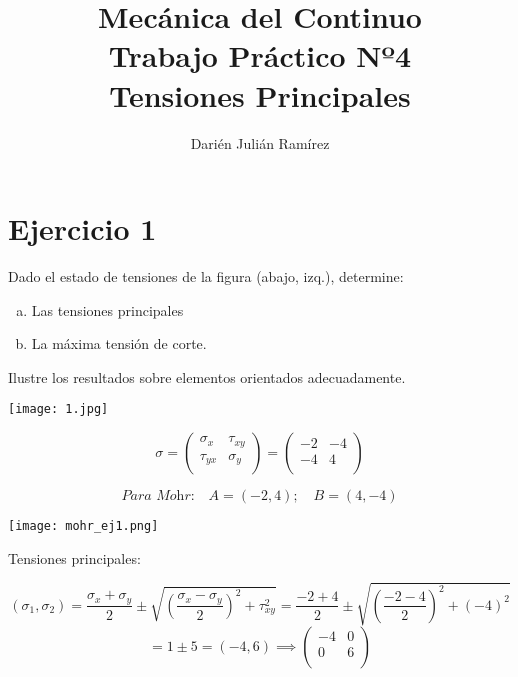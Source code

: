\documentclass[a4paper,12pt,twoside,final,spanish]{article}
\title{\Huge Mecánica del Continuo\\
Trabajo Práctico Nº4\\
Tensiones Principales}
\author{Darién Julián Ramírez}
\date{\vspace{-5ex}}
\begin{document}
\maketitle %

\section*{Ejercicio 1}

Dado el estado de tensiones de la figura (abajo, izq.), determine: 
\begin{enumerate}[a.]
\item Las tensiones principales 
\item La máxima tensión de corte.  
\end{enumerate}

Ilustre los resultados sobre elementos orientados adecuadamente.

\begin{center}
\texttt{[image: 1.jpg]}
\end{center}

\dotfill

\[
\sigma=
\left(\begin{matrix}
\sigma_{x} & \tau_{xy} \\
\tau_{yx} & \sigma_{y} \\
\end{matrix}\right)=
\left(\begin{matrix}
-2 & -4 \\
-4 & 4 \\
\end{matrix}\right)
\]

\[
\textit{Para Mohr:}\quad A=(-2,4);\quad B=(4,-4)
\]

\begin{center}
\texttt{[image: mohr\_ej1.png]}
\end{center}

Tensiones principales:

\[
(\sigma_{1},\sigma_{2})=\frac{\sigma_{x}+\sigma_{y}}{2}\pm\sqrt{\left(\frac{\sigma_{x}-\sigma_{y}}{2}\right)^{2}+\tau_{xy}^{2}}
=
\frac{-2+4}{2}\pm\sqrt{\left(\frac{-2-4}{2}\right)^{2}+(-4)^{2}}
\]
\[
=1\pm 5=(-4,6)\implies
\left(\begin{matrix}
-4 & 0 \\
0 & 6 \\
\end{matrix}\right)
\]
\end{document}
